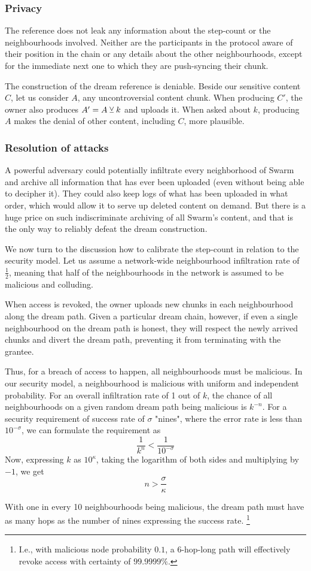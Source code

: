 \subsubsection{Privacy}


The reference does not leak any information about the step-count or the neighbourhoods involved. Neither are the participants in the protocol aware of their position in the chain or any details about the other neighbourhoods, except for the immediate next one to which they are push-syncing their chunk.

The construction of the dream reference is deniable.
Beside our sensitive content $C$, let us consider $A$, any uncontroversial content chunk. When producing $C'$, the owner also produces  $A'=A\veebar k$ and uploads it. When asked about $k$, producing $A$ makes the denial of other content, including $C$, more plausible. 

\subsubsection{Resolution of attacks}


A powerful adversary could potentially infiltrate every neighborhood of Swarm and archive all information that has ever been uploaded (even without being able to decipher it). They could also keep logs of what has been uploaded in what order, which would allow it to serve up deleted content on demand. But there is a huge price on such indiscriminate archiving of all Swarm's content, and that is the only way to reliably defeat the dream construction.

We now turn to the discussion how to calibrate the step-count in relation to the security model. Let us assume a network-wide neighbourhood infiltration rate of $\frac{1}{2}$, meaning that  half of the neighbourhoods in the network is assumed  to be  malicious and colluding. 

When access is revoked, the owner uploads new chunks in each neighbourhood along the dream path. 
Given a particular dream chain, however, if even a single neighbourhood on the dream path is honest, they will respect the newly arrived chunks and divert the dream path, preventing it from terminating with the grantee. 


Thus, for a breach of access to happen, all neighbourhoods must be malicious.
In our security model, a neighbourhood is malicious with  uniform and independent probability.  For an overall infiltration rate of 1 out of $k$, the chance of all neighbourhoods on a given random dream path being malicious is $k^{-n}$. For a security requirement of success rate of $\sigma$ "nines", where the error rate is less than $10^{-\sigma}$,  we can formulate the requirement as
%
\begin{equation}
    \frac{1}{k^n}< \frac{1}{10^{-\sigma}}
\end{equation}
Now, expressing $k$ as $10^\kappa$, taking the logarithm of both sides and multiplying by $-1$, we get
%
\begin{equation}
    n > \frac{\sigma}{\kappa}
\end{equation}

With one in every 10 neighbourhoods being malicious, the dream path must have as many hops as the number of nines expressing the success rate.%
%
\footnote{I.e., with malicious node probability $0.1$, a 6-hop-long path will effectively revoke access with certainty of $99.9999\%$.}
